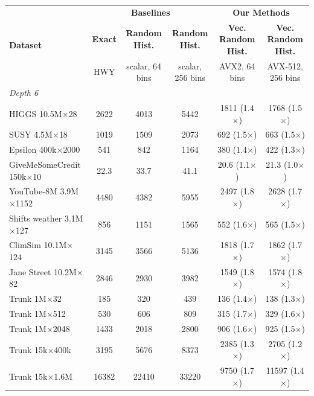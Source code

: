 \begin{table}[p]
    \centering
    \footnotesize
    \setlength{\tabcolsep}{2.5pt}
    \begin{tabular}{l|ccc|cc}
        \hline
        \multirow{3}{*}{\textbf{Dataset}} & \multicolumn{3}{c|}{\textbf{Baselines}} & \multicolumn{2}{c}{\textbf{Our Methods}} \\
         & \textbf{Exact} & \textbf{Random Hist.} & \textbf{Random Hist.} & \textbf{Vec. Random Hist.} & \textbf{Vec. Random Hist.} \\
         & \scriptsize HWY & \scriptsize scalar, 64 bins & \scriptsize scalar, 256 bins & \scriptsize AVX2, 64 bins & \scriptsize AVX-512, 256 bins \\
        \hline
        \multicolumn{6}{l}{\textit{Depth 6}} \\
        HIGGS 10.5M$\times$28 & 2622 & 4013 & 5442 & 1811 (1.4$\times$) & 1768 (1.5$\times$) \\
        SUSY 4.5M$\times$18 & 1019 & 1509 & 2073 & 692 (1.5$\times$) & 663 (1.5$\times$) \\
        Epsilon 400k$\times$2000 & 541 & 842 & 1164 & 380 (1.4$\times$) & 422 (1.3$\times$) \\
        GiveMeSomeCredit 150k$\times$10 & 22.3 & 33.7 & 41.1 & 20.6 (1.1$\times$) & 21.3 (1.0$\times$) \\
        YouTube-8M 3.9M$\times$1152 & 4480 & 4382 & 5955 & 2497 (1.8$\times$) & 2628 (1.7$\times$) \\
        Shifts weather 3.1M$\times$127 & 856 & 1151 & 1565 & 552 (1.6$\times$) & 565 (1.5$\times$) \\
        ClimSim 10.1M$\times$124 & 3145 & 3566 & 5136 & 1818 (1.7$\times$) & 1862 (1.7$\times$) \\
        Jane Street 10.2M$\times$82 & 2846 & 2930 & 3982 & 1549 (1.8$\times$) & 1574 (1.8$\times$) \\
        Trunk 1M$\times$32 & 185 & 320 & 439 & 136 (1.4$\times$) & 138 (1.3$\times$) \\
        Trunk 1M$\times$512 & 530 & 606 & 809 & 315 (1.7$\times$) & 329 (1.6$\times$) \\
        Trunk 1M$\times$2048 & 1433 & 2018 & 2800 & 906 (1.6$\times$) & 925 (1.5$\times$) \\
        Trunk 15k$\times$400k & 3195 & 5676 & 8373 & 2385 (1.3$\times$) & 2705 (1.2$\times$) \\
        Trunk 15k$\times$1.6M & 16382 & 22410 & 33220 & 9750 (1.7$\times$) & 11597 (1.4$\times$) \\

\end{tabular}
\end{table}
